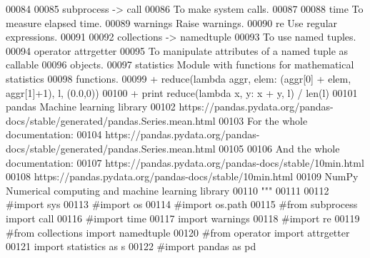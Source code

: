 \begin{DoxyCode}
{00084 \textcolor{stringliteral}{}
00085 \textcolor{stringliteral}{    subprocess -> call}
00086 \textcolor{stringliteral}{                To make system calls.}
00087 \textcolor{stringliteral}{}
00088 \textcolor{stringliteral}{    time        To measure elapsed time.}
00089 \textcolor{stringliteral}{    warnings    Raise warnings.}
00090 \textcolor{stringliteral}{    re          Use regular expressions.}
00091 \textcolor{stringliteral}{}
00092 \textcolor{stringliteral}{    collections -> namedtuple}
00093 \textcolor{stringliteral}{                To use named tuples.}
00094 \textcolor{stringliteral}{    operator    attrgetter}
00095 \textcolor{stringliteral}{                To manipulate attributes of a named tuple as callable}
00096 \textcolor{stringliteral}{                    objects.}
00097 \textcolor{stringliteral}{    statistics  Module with functions for mathematical statistics}
00098 \textcolor{stringliteral}{                    functions.}
00099 \textcolor{stringliteral}{                    + reduce(lambda aggr, elem: (aggr[0] + elem, aggr[1]+1), l, (0.0,0))}
00100 \textcolor{stringliteral}{                    + print reduce(lambda x, y: x + y, l) / len(l)}
00101 \textcolor{stringliteral}{    pandas      Machine learning library}
00102 \textcolor{stringliteral}{                    https://pandas.pydata.org/pandas-docs/stable/generated/pandas.Series.mean.html}
00103 \textcolor{stringliteral}{                    For the whole documentation:}
00104 \textcolor{stringliteral}{                    https://pandas.pydata.org/pandas-docs/stable/generated/pandas.Series.mean.html}
00105 \textcolor{stringliteral}{}
00106 \textcolor{stringliteral}{                    And the whole documentation:}
00107 \textcolor{stringliteral}{                        https://pandas.pydata.org/pandas-docs/stable/10min.html}
00108 \textcolor{stringliteral}{                        https://pandas.pydata.org/pandas-docs/stable/10min.html}
00109 \textcolor{stringliteral}{    NumPy       Numerical computing and machine learning library}
00110 \textcolor{stringliteral}{"""}
00111 
00112 \textcolor{comment}{#import sys}
00113 \textcolor{comment}{#import os}
00114 \textcolor{comment}{#import os.path}
00115 \textcolor{comment}{#from subprocess import call}
00116 \textcolor{comment}{#import time}
00117 \textcolor{keyword}{import} warnings
00118 \textcolor{comment}{#import re}
00119 \textcolor{comment}{#from collections import namedtuple}
00120 \textcolor{comment}{#from operator import attrgetter}
00121 \textcolor{keyword}{import} statistics \textcolor{keyword}{as} s
00122 \textcolor{comment}{#import pandas as pd}
}
\end{DoxyCode}

